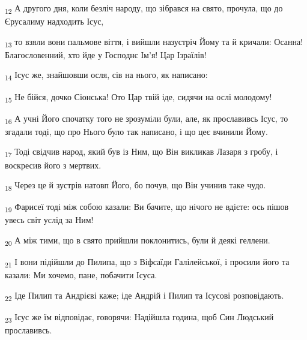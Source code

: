 \begin{tcolorbox}
\textsubscript{12} А другого дня, коли безліч народу, що зібрався на свято, прочула, що до Єрусалиму надходить Ісус,
\end{tcolorbox}
\begin{tcolorbox}
\textsubscript{13} то взяли вони пальмове віття, і вийшли назустріч Йому та й кричали: Осанна! Благословенний, хто йде у Господнє Ім'я! Цар Ізраїлів!
\end{tcolorbox}
\begin{tcolorbox}
\textsubscript{14} Ісус же, знайшовши осля, сів на нього, як написано:
\end{tcolorbox}
\begin{tcolorbox}
\textsubscript{15} Не бійся, дочко Сіонська! Ото Цар твій іде, сидячи на ослі молодому!
\end{tcolorbox}
\begin{tcolorbox}
\textsubscript{16} А учні Його спочатку того не зрозуміли були, але, як прославивсь Ісус, то згадали тоді, що про Нього було так написано, і що цеє вчинили Йому.
\end{tcolorbox}
\begin{tcolorbox}
\textsubscript{17} Тоді свідчив народ, який був із Ним, що Він викликав Лазаря з гробу, і воскресив його з мертвих.
\end{tcolorbox}
\begin{tcolorbox}
\textsubscript{18} Через це й зустрів натовп Його, бо почув, що Він учинив таке чудо.
\end{tcolorbox}
\begin{tcolorbox}
\textsubscript{19} Фарисеї тоді між собою казали: Ви бачите, що нічого не вдієте: ось пішов увесь світ услід за Ним!
\end{tcolorbox}
\begin{tcolorbox}
\textsubscript{20} А між тими, що в свято прийшли поклонитись, були й деякі геллени.
\end{tcolorbox}
\begin{tcolorbox}
\textsubscript{21} І вони підійшли до Пилипа, що з Віфсаїди Галілейської, і просили його та казали: Ми хочемо, пане, побачити Ісуса.
\end{tcolorbox}
\begin{tcolorbox}
\textsubscript{22} Іде Пилип та Андрієві каже; іде Андрій і Пилип та Ісусові розповідають.
\end{tcolorbox}
\begin{tcolorbox}
\textsubscript{23} Ісус же їм відповідає, говорячи: Надійшла година, щоб Син Людський прославивсь.
\end{tcolorbox}
